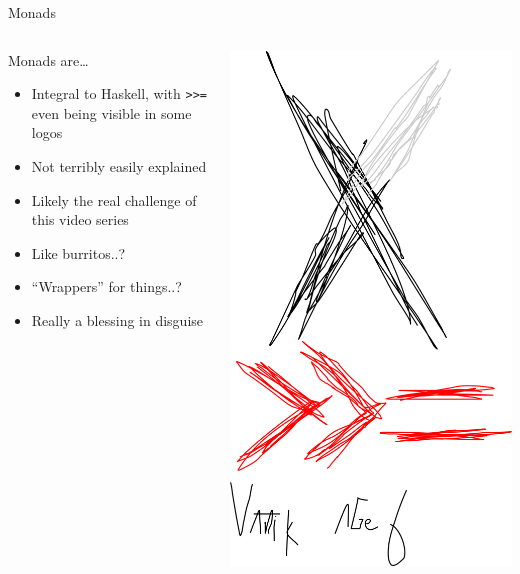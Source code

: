 \documentclass{beamer}
\begin{document}
			\begin{frame}{Monads}
				\begin{columns}
					\begin{column}{0.75\textwidth}
						Monads are\dots
						\begin{itemize}
							\item Integral to Haskell, with \texttt{>>=} even being
								visible in some logos
							\item Not terribly easily explained
							\item Likely the real challenge of this video series
							\item Like burritos..?
							\item ``Wrappers'' for things..?
							\item Really a blessing in disguise
						\end{itemize}
					\end{column}
					\begin{column}{0.25\textwidth}
						\includegraphics[width=1\textwidth]{x-mow-nads.png}

\end{column}
\end{columns}
\end{frame}
\end{document}
